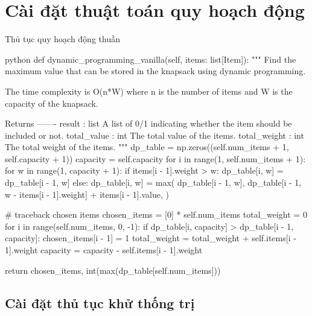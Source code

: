 \section{Cài đặt thuật toán quy hoạch động}

Thủ tục quy hoạch động thuần

\begin{mintedbox}{python}
    def dynamic_programming_vanilla(self, items: list[Item]):
        """
        Find the maximum value that can be stored in the knapsack using dynamic programming.

        The time complexity is O(n*W) where n is the number of items and W is the capacity of the knapsack.

        Returns
        -------
        result : list
            A list of 0/1 indicating whether the item should be included or not.
        total_value : int
            The total value of the items.
        total_weight : int
            The total weight of the items.
        """
        dp_table = np.zeros((self.num_items + 1, self.capacity + 1))
        capacity = self.capacity
        for i in range(1, self.num_items + 1):
            for w in range(1, capacity + 1):
                if items[i - 1].weight > w:
                    dp_table[i, w] = dp_table[i - 1, w]
                else:
                    dp_table[i, w] = max(
                        dp_table[i - 1, w],
                        dp_table[i - 1, w - items[i - 1].weight] + items[i - 1].value,
                    )

        # traceback chosen items
        chosen_items = [0] * self.num_items
        total_weight = 0
        for i in range(self.num_items, 0, -1):
            if dp_table[i, capacity] > dp_table[i - 1, capacity]:
                chosen_items[i - 1] = 1
                total_weight = total_weight + self.items[i - 1].weight
                capacity = capacity - self.items[i - 1].weight

        return chosen_items, int(max(dp_table[self.num_items]))
\end{mintedbox}


\subsection{Cài đặt thủ tục khử thống trị}

